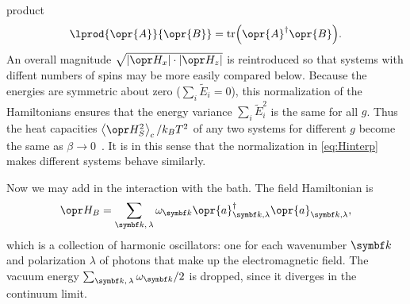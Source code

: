 \documentclass[../thesis.tex]{subfiles}
\begin{document}
product
\begin{equation}
  \lprod{\opr{A}}{\opr{B}}
  = \tr(\opr{A}^\dag \opr{B}).
\end{equation}
An overall magnitude $\sqrt{\abs{\ham_x}\cdot\abs{\ham_z}}$ is reintroduced so
that systems with diffent numbers of spins may be more easily compared below.
Because the energies are symmetric about zero ($\sum_i \tilde{E}_i = 0$), this
normalization of the Hamiltonians ensures that the energy variance $\sum_i
\tilde{E}_i^2$ is the same for all $g$. Thus the heat capacities
$\ev{\ham_S^2}_c / k_B T^2$ of any two systems for different $g$ become the same
as $\beta \to 0$~\cite[p.~112]{kardarStatisticalPhysicsParticles2007}. It is in
this sense that the normalization in \cref{eq:Hinterp} makes different systems
behave similarly.

Now we may add in the interaction with the bath. The field Hamiltonian is
\begin{equation}
  \ham_B
  = \sum_{\vq{k},\, \lambda} \omega_{\vq{k}}
  \opr{a}^\dag_{\vq{k},\lambda}\opr{a}_{\vq{k},\lambda},
  \label{eq:bath-hamiltonian}
\end{equation}
which is a collection of harmonic oscillators: one for each wavenumber $\vq{k}$
and polarization $\lambda$ of photons that make up the electromagnetic field.
The vacuum energy $\sum_{\vq{k},\, \lambda} \omega_{\vq{k}} / 2$ is dropped,
since it diverges in the continuum limit.
\end{document}
